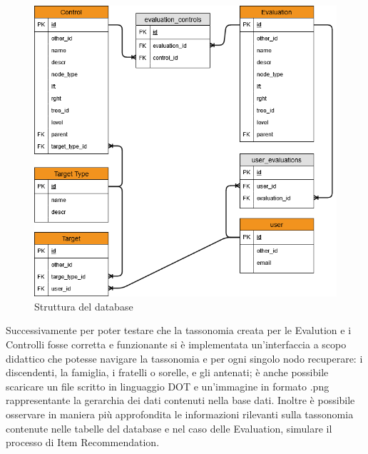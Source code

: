 \begin{figure}[ht!]
	\centering
	\includegraphics[scale=0.7]{images/MoonCloudRecommendation_ER.png}
	\caption{Struttura del database}
	\label{fig:str_db_project}
\end{figure}


Successivamente per poter testare che la tassonomia creata per le Evalution e i Controlli fosse corretta e funzionante si è 
implementata un'interfaccia a scopo didattico che potesse navigare la tassonomia e per ogni singolo nodo recuperare: i 
discendenti, la famiglia, i fratelli o sorelle, e gli antenati; è anche possibile scaricare un file scritto in linguaggio
DOT e un'immagine in formato .png rappresentante la gerarchia dei dati contenuti nella base dati. 
Inoltre è possibile osservare in maniera più approfondita le informazioni rilevanti sulla tassonomia contenute nelle tabelle
del database e nel caso delle Evaluation, simulare il processo di Item Recommendation.

